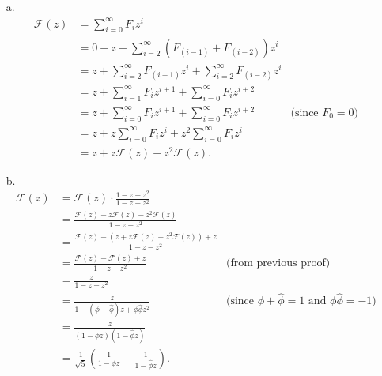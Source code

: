 \begin{enumerate}
\begin{framed}
  \begin{enumerate}
    \item[a.]
      \begin{equation*}
      \begin{aligned}
        \mathcal{F}(z) &= \sum_{i = 0}^{\infty} F_i z^i\\
                       &= 0 + z + \sum_{i = 2}^{\infty} (F_{(i - 1)} + F_{(i - 2)}) z^i\\
                       &= z + \sum_{i = 2}^{\infty} F_{(i - 1)} z^i + \sum_{i = 2}^{\infty} F_{(i - 2)} z^i\\
                       &= z + \sum_{i = 1}^{\infty} F_i z^{i + 1} + \sum_{i = 0}^{\infty} F_i z^{i + 2}\\
                       &= z + \sum_{i = 0}^{\infty} F_i z^{i + 1} + \sum_{i = 0}^{\infty} F_i z^{i + 2} & \text{(since $F_0 = 0$)}\\
                       &= z + z \sum_{i = 0}^{\infty} F_i z^{i} + z^2 \sum_{i = 0}^{\infty} F_i z^{i}\\
                       &= z + z \mathcal{F}(z) + z^2 \mathcal{F}(z).
      \end{aligned}
      \end{equation*}
    \newpage
    \item[b.]
      \begin{equation*}
        \begin{aligned}
          \mathcal{F}(z) &= \mathcal{F}(z) \cdot \frac{1 - z - z^2}{1 - z - z^2}\\
                         &= \frac{\mathcal{F}(z) - z\mathcal{F}(z) - z^2 \mathcal{F}(z)}{1 - z - z^2}\\
                         &= \frac{\mathcal{F}(z) - (z + z \mathcal{F}(z) + z^2 \mathcal{F}(z)) + z}{1 - z - z^2}\\
                         &= \frac{\mathcal{F}(z) - \mathcal{F}(z) + z}{1 - z - z^2} & \text{(from previous proof)}\\
                         &= \frac{z}{1 - z - z^2}\\
                         &= \frac{z}{1 - (\phi + \hat\phi)z + \phi \hat\phi z^2}
                         & \text{(since $\phi + \hat\phi = 1$ and $\phi \hat\phi = -1$)}\\
                         &= \frac{z}{(1 - \phi z)(1 - \hat\phi z)}\\
                         &= \frac{1}{\sqrt 5} \left(\frac{1}{1 - \phi z} - \frac{1}{1 - \hat\phi z}\right).

\end{aligned}
\end{equation*}
\end{enumerate}
\end{framed}
\end{enumerate}
